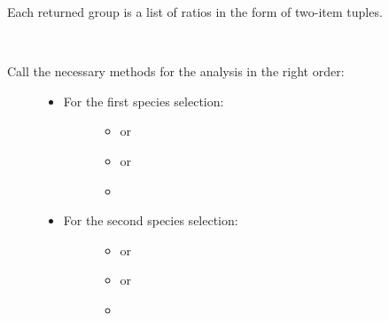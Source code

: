 \documentclass[letterpaper,10pt,english]{sphinxmanual}
\begin{document}
\begin{fulllineitems}
\begin{fulllineitems}
Each returned group is a list of ratios in the form of two-item
tuples.

\end{fulllineitems}


\begin{fulllineitems}
\label{setlyze/analysis/attraction_inter:setlyze.analysis.attraction_inter.Start.run}~\begin{description}
\item[{Call the necessary methods for the analysis in the right order:}] \leavevmode\begin{itemize}
\item {} \begin{description}
\item[{For the first species selection:}] \leavevmode\begin{itemize}
\item {} 
{\hyperref[setlyze/database:setlyze.database.AccessLocalDB.get_record_ids]{}} or

\item {} 
{\hyperref[setlyze/database:setlyze.database.AccessLocalDB.set_species_spots]{}} or

\item {} 
{\hyperref[setlyze/database:setlyze.database.AccessDBGeneric.make_plates_unique]{}}

\end{itemize}

\end{description}

\item {} \begin{description}
\item[{For the second species selection:}] \leavevmode\begin{itemize}
\item {} 
{\hyperref[setlyze/database:setlyze.database.AccessLocalDB.get_record_ids]{}} or

\item {} 
{\hyperref[setlyze/database:setlyze.database.AccessLocalDB.set_species_spots]{}} or

\item {} 
{\hyperref[setlyze/database:setlyze.database.AccessDBGeneric.make_plates_unique]{}}


\end{itemize}
\end{description}
\end{itemize}
\end{description}
\end{fulllineitems}
\end{fulllineitems}
\end{document}
